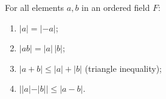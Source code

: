 For all elements \(a, b\) in an ordered field \(F\):
\begin{enumerate}
\item[(i)] \(|a| = |-a|\);
\item[(ii)] \(|ab| = |a|\,|b|\);
\item[(iii)] \(|a + b| \leq |a| + |b|\) (triangle inequality);
\item[(iv)] \(||a| - |b|| \leq |a - b|\).
\end{enumerate}